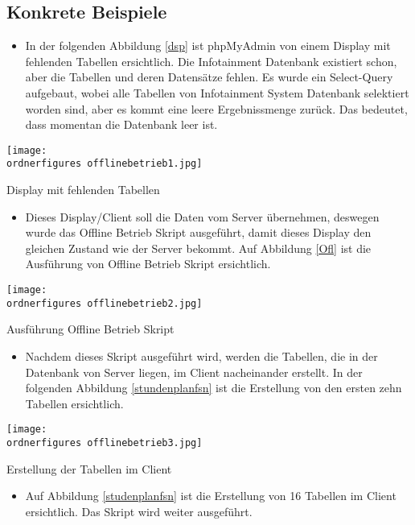 \subsection{Konkrete Beispiele}
\begin{itemize}
	\item In der folgenden Abbildung \ref{dsp} ist phpMyAdmin von einem Display mit fehlenden Tabellen ersichtlich. Die Infotainment Datenbank existiert schon, aber die Tabellen und deren Datens\"atze fehlen. Es wurde ein Select-Query aufgebaut, wobei alle Tabellen von Infotainment System Datenbank selektiert worden sind, aber es kommt eine leere Ergebnissmenge zur\"uck. Das bedeutet, dass momentan die Datenbank leer ist.
\end{itemize}
\begin{center}
	\captionsetup{type=figure}
	\texttt{[image: \\ordnerfigures offlinebetrieb1.jpg]}
	\caption{Display mit fehlenden Tabellen}
	\label{dsp} 
\end{center}
\begin{itemize}
	\item Dieses Display/Client soll die Daten vom Server \"ubernehmen, deswegen wurde das Offline Betrieb Skript ausgef\"uhrt, damit dieses Display den gleichen Zustand wie der Server bekommt. Auf Abbildung \ref{Ofl} ist die Ausf\"uhrung von Offline Betrieb Skript ersichtlich.
\end{itemize}
\begin{center}
	\captionsetup{type=figure}
	\texttt{[image: \\ordnerfigures offlinebetrieb2.jpg]}
	\caption{Ausf\"uhrung Offline Betrieb Skript}
	\label{Ofl} 
\end{center}
\begin{itemize}
	\item Nachdem dieses Skript ausgef\"uhrt wird, werden die Tabellen, die in der Datenbank von Server liegen, im Client nacheinander erstellt. In der folgenden Abbildung \ref{stundenplanfsn} ist die Erstellung von den ersten zehn Tabellen ersichtlich. 
\end{itemize}
\begin{center}
	\captionsetup{type=figure}
	\texttt{[image: \\ordnerfigures offlinebetrieb3.jpg]}
	\caption{Erstellung der Tabellen im Client}
	\label{stundenplanfsn} 
\end{center}
\begin{itemize}
	\item Auf Abbildung \ref{studenplanfsn} ist die Erstellung von 16 Tabellen im Client ersichtlich. Das Skript wird weiter ausgef\"uhrt. 
\end{itemize}
